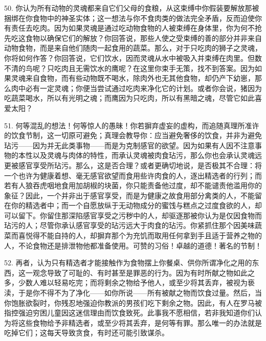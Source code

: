 50. 你认为所有动物的灵魂都来自它们父母的食粮，从这束缚中你假装要解放那被捆绑在你食物中的神圣实体；这一想法与你不食肉类的做法完全矛盾，反而迫使你有责任去吃肉。因为如果灵魂是通过吃动物食物的人被束缚在身体里，你为何不抢先吃这食物以确保它们的解放？你回答说，那些人使之受束缚的善的部分并非来自动物食物，而是来自他们随肉一起食用的蔬菜。那么，对于只吃肉的狮子之灵魂，你将如何作答？你回答说，它们饮水，因而灵魂从水中被吸入并束缚在肉里。但数不清的鸟呢？只吃肉且无需饮水的鹰呢？在这里你束手无策，找不到答案。因为如果灵魂来自食物，而有些动物既不喝水，除肉外也无其他食物，却仍产下幼崽，那么肉中必有一定灵魂；你便当尝试通过吃肉来净化它的计划。或者你会说，猪因为吃蔬菜喝水，所以有光明之魂；而鹰因为只吃肉，所以有黑暗之魂，尽管它如此喜爱太阳？\par

51. 何等混乱的想法！何等惊人的愚昧！你若摒弃虚妄的虚构，而追随真理所准许的饮食节制，这一切原可避免；真理会教导你：应当避免奢侈的饮食，并非为避免玷污——因为并无此类事物——而是为克制感官的欲望。因为如果有人因不注意事物的本性以及灵魂与肉体的特性，而承认灵魂被肉食玷污，那么你也会承认灵魂远更被感官享受所玷污。那么，这是否合理？或者更确切地说，是否极其不合理：将一个也许为健康着想、毫无感官欲望而食用些许肉食的人，逐出精选者的行列；而若有人狼吞虎咽地食用加胡椒的块菌，你只能责备他过度，却不能谴责他滥用你的象征？因此，一个并非出于感官享受，而是为健康之故食用部分禽类的人，不能留在你的精选者中；而一个自愿放纵于无动物成分的蜜饯与糕点之过度食欲的人，却可以留下。你留住那深陷感官享受之污秽中的人，却驱逐那被你认为是仅因食物而玷污的人；尽管你承认感官享受的玷污远大于肉食的玷污。你紧抓住那个因美味蔬菜而喜悦得不能自持的人，却摒弃那个为充饥而取用任何拿到手且适于营养之物的人，不论食物还是排泄物他都准备使用。可赞的习俗！卓越的道德！著名的节制！\par

52. 再者，认为只有精选者才能接触作为食物摆上你餐桌、供你所谓净化之用的东西，这一观念导致了可耻的、有时甚至是罪恶的行为。因为有时所献之物如此之多，少数人难以轻易吃完；而将剩余之物给予他人，或至少将其丢弃，被视为亵渎，于是你不得不为了净化——如你所说——所有被献之物而饮食过量。然后，当你饱胀欲裂时，你残忍地强迫你教派的男孩们吃下剩余之物。因此，有人在罗马被指控强迫穷困儿童因这迷信理由而饮食致死。此事我不愿相信，若非我知道你们认为将这些食物给予非精选者，或至少将其丢弃，是何等有罪。那么唯一的办法就是吃掉它们；这每天导致贪食，有时还可能引致谋杀。\par

